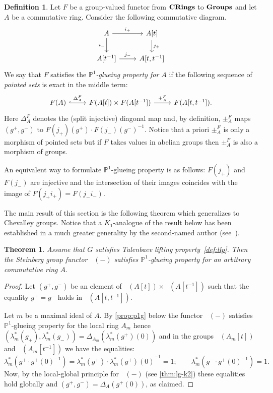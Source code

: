 \documentclass[oneside,12pt]{amsart}
\newtheorem{thm}{Theorem}
\numberwithin{equation}{section}
\numberwithin{lem}{section}
\theoremstyle{definition}
\newtheorem{dfn}[lem]{Definition}
\theoremstyle{remark}
\DeclareMathOperator{\St}{St^G}
\newcommand{\catname}[1]{{\normalfont\textbf{#1}}}
\newcommand{\Pro}{\mathbb{P}}
\begin{document}
\begin{dfn} \label{def:p1g} Let $F$ be a group-valued functor from $\catname{CRings}$ to $\catname{Groups}$ and let $A$ be a commutative ring.
Consider the following commutative diagram.
\[ \begin{tikzcd} A \ar[r, "i_+"] \ar[d, "i_-"'] & A[t] \ar[d, "j_+"] \\ A[t^{-1}] \ar[r, "j_-"] & A[t, t^{-1}] \end{tikzcd} \]
We say that $F$ satisfies the \emph{$\Pro^1$-glueing property for $A$} if the following sequence of \emph{pointed sets} is exact in the middle term:
\[ \begin{tikzcd} F(A) \ar[r, hookrightarrow, "\Delta_A^F"] & F(A[t]) \times F(A[t^{-1}]) \ar[r, "\pm_A^F"] & F(A[t, t^{-1}]). \end{tikzcd} \]
Here $\Delta^F_A$ denotes the (split injective) diagonal map and, by definition, $\pm_A^F$ maps $(g^+, g^-)$ to $F(j_+)(g^+) \cdot F(j_-)(g^-)^{-1}.$
Notice that a priori $\pm_A^F$ is only a morphism of pointed sets but if $F$ takes values in abelian groups then $\pm_A^F$ is also a morphism of groups.

An equivalent way to formulate $\Pro^1$-glueing property is as follows:
$F(j_+)$ and $F(j_-)$ are injective and the intersection of their images coincides with the image of $F(j_+ i_+) = F(j_- i_-).$ \end{dfn}

The main result of this section is the following theorem which generalizes \cite[Theorem~5.1]{Tu} to Chevalley groups.
Notice that a $K_1$-analogue of the result below has been established in a much greater generality by the second-named author (see~\cite[Theorem~1.1]{St-poly}).
\begin{thm} \label{thm:p1} Assume that $G$ satisfies Tulenbaev lifting property~\ref{def:tlp}.
Then the Steinberg group functor $\St(-)$ satisfies $\Pro^1$-glueing property for an arbitrary commutative ring $A$. \end{thm}
\begin{proof}
 Let $(g^+, g^-)$ be an element of $\St(A[t]) \times \St(A[t^{-1}])$ such that the equality $g^+ = g^-$ holds in $\St(A[t, t^{-1}])$.

 Let $m$ be a maximal ideal of $A$.
 By \cref{prop:p1g} below the functor $\St(-)$ satisfies $\Pro^1$-glueing property for the local ring $A_m$ hence
 $(\lambda_m^*(g_+), \lambda_m^*(g_-)) = \Delta_{A_m}(\lambda_m^*(g^+)(0))$ and in the groups $\St(A_m[t])$ and $\St(A_m[t^{-1}])$ we have the equalities:
 $$\lambda_m^*(g^+ \cdot g^+(0)^{-1}) = \lambda_m^*(g^+) \cdot {\lambda_m^*(g^+)(0)}^{-1} = 1; \qquad \lambda_m^*(g^-\cdot g^+(0)^{-1}) =1. $$
 Now, by the local-global principle for $\St(-)$ (see \cref{thm:lg-k2}) these equalities hold globally and $(g^+, g^-) = \Delta_A(g^+(0))$, as claimed.
\end{proof}
\end{document}
